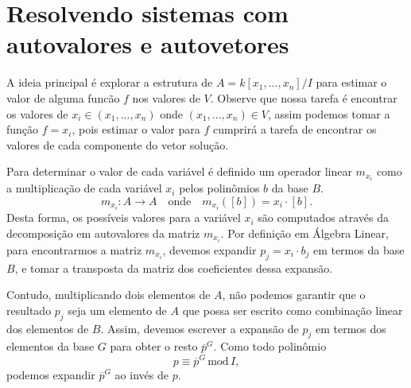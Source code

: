 \documentclass[a4paper,12pt,oneside,onecolumn,final,fleqn]{repUERJ}
\begin{document}
\section{Resolvendo sistemas com autovalores e autovetores}

A ideia principal é explorar a estrutura de $A=k[x_1,...,x_n]/I$ para estimar o valor de alguma funcão $f$ nos valores de $V$. Observe que nossa tarefa é encontrar os valores de $x_i\in (x_1,...,x_n)$ onde $(x_1,...,x_n)\in V$, assim podemos tomar a função $f=x_i$, pois estimar o valor para $f$ cumprirá a tarefa de encontrar os valores de cada componente do vetor solução.

Para determinar o valor de cada variável é definido um operador linear $m_{x_i}$ como a multiplicação de cada variável $x_i$ pelos polinômios $b$ da base $B$.
\begin{equation*}
m_{x_i}:A\rightarrow A\quad\text{onde}\quad m_{x_i}([b])=x_i\cdot[b].
\end{equation*} 
Desta forma, os possíveis valores para a variável $x_i$ são computados através da decomposição em autovalores da matriz $m_{x_i}$. Por definição em Álgebra Linear, para encontrarmos a matriz $m_{x_i}$,  devemos expandir $p_j=x_i\cdot b_j$ em termos da base $B$, e tomar a transposta da matriz dos coeficientes dessa expansão.

Contudo, multiplicando dois elementos de $A$, não podemos garantir que o resultado $p_j$ seja um elemento de $A$ que possa ser escrito como combinação linear dos elementos de $B$. Assim, devemos escrever a expansão de $p_j$ em termos dos elementos da base $G$ para obter o resto $\overline{p}^{G}$. Como todo polinômio
\begin{equation}\label{eq.resto-mod}
p\equiv\overline{p}^{G}\,\text{mod}\,I,
\end{equation} 
podemos expandir $\overline{p}^{G}$ ao invés de $p$. 
\end{document}
